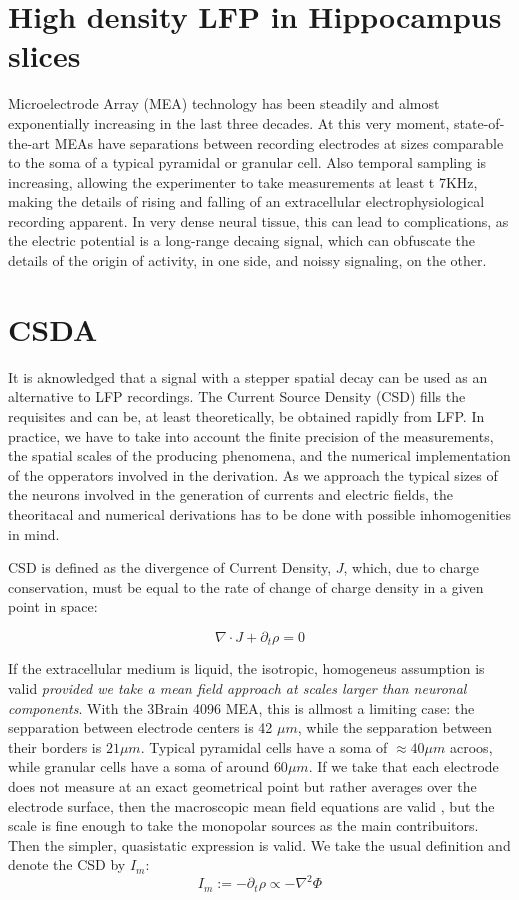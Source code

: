 \documentclass{article}
\begin{document}
\section{High density LFP in Hippocampus slices}


Microelectrode Array (MEA) technology has been steadily and almost exponentially increasing in the last three decades. At this very moment, state-of-the-art MEAs have separations between recording electrodes at sizes comparable to the soma of a typical pyramidal or granular cell. Also temporal sampling is increasing, allowing the experimenter to take measurements at least t 7KHz, making the details of rising and falling of an extracellular electrophysiological recording apparent. In very dense neural tissue, this can lead to complications, as the electric potential is a long-range decaing signal, which can obfuscate the details of the origin of activity, in one side, and noissy signaling, on the other.


\section{CSDA}


It is aknowledged that a signal with a stepper spatial decay can be used as an alternative to LFP recordings. The Current Source Density (CSD) fills the requisites and can be, at least theoretically, be obtained rapidly from LFP. In practice, we have to take into account the finite precision of the measurements, the spatial scales of the producing phenomena, and the numerical implementation of the opperators involved in the derivation. 
As we approach the typical sizes of the neurons involved in the generation of currents and electric fields, the theoritacal and numerical derivations has to be done with possible inhomogenities in mind. 

CSD is defined as the divergence of Current Density, $J$, which, due to charge conservation, must be equal to the rate of change of charge density in a given point in space:

\begin{equation}
  \nabla \cdot J + \partial_t \rho=0
\end{equation}

If the extracellular medium is liquid, the isotropic, homogeneus assumption is valid
\emph{provided we take a mean field approach at scales larger than neuronal components}. With the 3Brain 4096 MEA, this is allmost a limiting case: the sepparation between electrode centers is 42 $\mu m$, while the sepparation between their borders is $21 \mu m$.
Typical pyramidal cells have a soma of $\approx 40 \mu m$ acroos, while granular cells have a soma of around $60 \mu m$. If we take that each electrode does not measure at an exact geometrical point but rather averages over the electrode surface, then the macroscopic mean field equations are valid \cite{Bedard11}, but the scale is fine enough to take the monopolar sources as the main contribuitors. Then the simpler, quasistatic expression is valid. We take the usual definition and denote the CSD by $I_m$:
\begin{equation}\label{defCSD}
  I_m := -\partial_t \rho \propto -\nabla^2 \Phi 
\end{equation}
\end{document}
